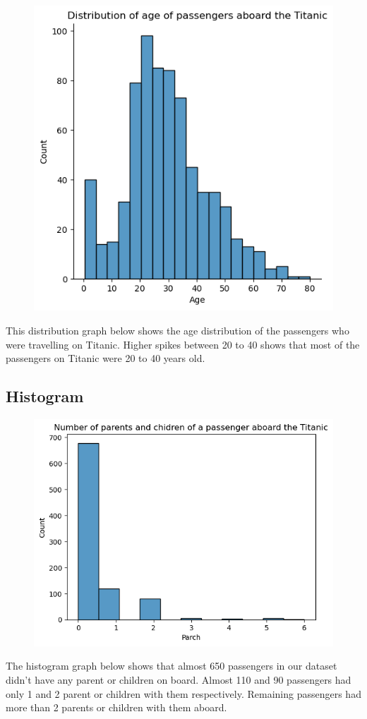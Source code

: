 \documentclass[a4paper, 12pt]{article}
\begin{document}
\begin{figure}[h]
    \centering
    \includegraphics[width=13cm]{distplot.png}
\end{figure}

This distribution graph below shows the age distribution of the passengers who were travelling on Titanic. Higher spikes between 20 to 40 shows that most of the passengers on Titanic were 20 to 40 years old.

\subsection*{Histogram}

\begin{figure}[h]
  \centering
  \includegraphics[width=13cm]{histplot.png}
\end{figure}

The histogram graph below shows that almost 650 passengers in our dataset didn't have any parent or children on board. Almost 110 and 90 passengers had only 1 and 2 parent or children with them respectively. Remaining passengers had more than 2 parents or children with them aboard. 
\end{document}
